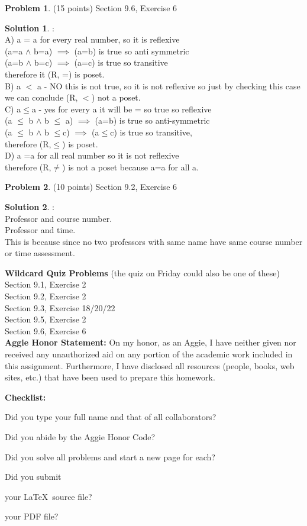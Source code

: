 \documentclass{article}
\theoremstyle{definition}
\newtheorem{problem}{Problem}
\newtheorem*{solution}{Solution}
\newcommand{\honor}{\noindent \textbf{Aggie Honor Statement: }On my honor, as an Aggie, I have neither
  given nor received any unauthorized aid on any portion of the
  academic work included in this assignment. Furthermore, I have
  disclosed all resources (people, books, web sites, etc.) that have
  been used to prepare this homework. 
}
\newcommand{\checklist}{\noindent\textbf{Checklist:}
\begin{compactenum}
\item Did you type your full name and that of all collaborators? 
\item Did you abide by the Aggie Honor Code?
\item Did you solve all problems and start a new page for each? 
\item Did you submit
\begin{compactenum}
\item your \LaTeX\ source file?
\item your  PDF file?
\end{compactenum}
\end{compactenum}
}
\begin{document}
\begin{problem} (15 points) Section 9.6, Exercise 6
\end{problem}
\begin{solution}:
\\
A) a = a for every real number, so it is reflexive \\
(a=a $\wedge$ b=a) $\implies$ (a=b) is true so anti symmetric \\
(a=b $\wedge$ b=c) $\implies$ (a=c) is true so transitive \\
therefore it (R, =) is poset.
\\

B) a $<$ a  - NO this is not true, so it is not reflexive so just by checking this case we can conclude (R, $<$) not a poset. \\

C) a$\leq$a - yes for every a it will be = so true so reflexive \\ 
(a $\leq$ b $\wedge$ b $\leq$ a) $\implies$ (a=b) is true so anti-symmetric \\ 
(a $\leq$ b $\wedge$ b $\leq$c) $\implies$ (a$\leq$c) is true so transitive, \\
therefore (R,$\leq$) is poset.\\

D) a =a for all real number so it is not reflexive \\
therefore (R,$\neq$) is not a poset because a=a for all a. 
\end{solution}

\newpage

\begin{problem} (10 points) Section 9.2, Exercise 6
\end{problem}
\begin{solution} :
\\
Professor and course number.
\\
Professor and time.
\\

This is because since no two professors with same name have same course number or time assessment.
\end{solution}


\goodbreak
\noindent
\textbf{Wildcard Quiz Problems} (the quiz on Friday could also be one of these)\\
Section 9.1, Exercise 2\\
Section 9.2, Exercise 2\\
Section 9.3, Exercise 18/20/22\\
Section 9.5, Exercise 2\\
Section 9.6, Exercise 6\\


\goodbreak
\honor

\bigskip
\checklist
\end{document}
